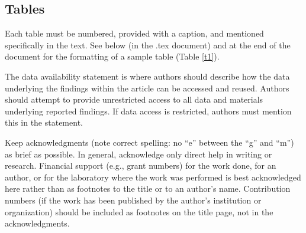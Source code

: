 \documentclass{ametsocV5}
\begin{document}
\subsection{Tables}
Each table must be numbered, provided with a caption, and mentioned
specifically in the text. 
See below (in the .tex document) and at the end of the document for the formatting of a sample table (Table
\ref{t1}).


% 
%
\datastatement
The data availability statement is where authors should describe how the data underlying the findings within the article can be accessed and reused. 
Authors should attempt to provide unrestricted access to all data and materials underlying reported findings. If data access is restricted, 
authors must mention this in the statement.

\acknowledgments
Keep acknowledgments (note correct spelling: no ``e'' between the ``g'' and
``m'') as brief as possible. In general, acknowledge only direct help in
writing or research. Financial support (e.g., grant numbers) for the work
done, for an author, or for the laboratory where the work was performed is
best acknowledged here rather than as footnotes to the title or to an
author's name. Contribution numbers (if the work has been published by the
author's institution or organization) should be included as footnotes on the title page,
not in the acknowledgments.
\end{document}
